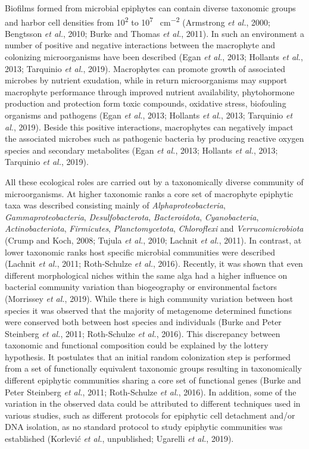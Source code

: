 \documentclass[12pt,]{article}
\begin{document}
Biofilms formed from microbial epiphytes can contain diverse taxonomic
groups and harbor cell densities from 10\textsuperscript{2} to
10\textsuperscript{7} \si{\cells\per\cm\squared} (Armstrong \emph{et
al.}, 2000; Bengtsson \emph{et al.}, 2010; Burke and Thomas \emph{et
al.}, 2011). In such an environment a number of positive and negative
interactions between the macrophyte and colonizing microorganisms have
been described (Egan \emph{et al.}, 2013; Hollants \emph{et al.}, 2013;
Tarquinio \emph{et al.}, 2019). Macrophytes can promote growth of
associated microbes by nutrient exudation, while in return
microorganisms may support macrophyte performance through improved
nutrient availability, phytohormone production and protection form toxic
compounds, oxidative stress, biofouling organisms and pathogens (Egan
\emph{et al.}, 2013; Hollants \emph{et al.}, 2013; Tarquinio \emph{et
al.}, 2019). Beside this positive interactions, macrophytes can
negatively impact the associated microbes such as pathogenic bacteria by
producing reactive oxygen species and secondary metabolites (Egan
\emph{et al.}, 2013; Hollants \emph{et al.}, 2013; Tarquinio \emph{et
al.}, 2019).

All these ecological roles are carried out by a taxonomically diverse
community of microorganisms. At higher taxonomic ranks a core set of
macrophyte epiphytic taxa was described consisting mainly of
\emph{Alphaproteobacteria}, \emph{Gammaproteobacteria},
\emph{Desulfobacterota}, \emph{Bacteroidota}, \emph{Cyanobacteria},
\emph{Actinobacteriota}, \emph{Firmicutes}, \emph{Planctomycetota},
\emph{Chloroflexi} and \emph{Verrucomicrobiota} (Crump and Koch, 2008;
Tujula \emph{et al.}, 2010; Lachnit \emph{et al.}, 2011). In contrast,
at lower taxonomic ranks host specific microbial communities were
described (Lachnit \emph{et al.}, 2011; Roth-Schulze \emph{et al.},
2016). Recently, it was shown that even different morphological niches
within the same alga had a higher influence on bacterial community
variation than biogeography or environmental factors (Morrissey \emph{et
al.}, 2019). While there is high community variation between host
species it was observed that the majority of metagenome determined
functions were conserved both between host species and individuals
(Burke and Peter Steinberg \emph{et al.}, 2011; Roth-Schulze \emph{et
al.}, 2016). This discrepancy between taxonomic and functional
composition could be explained by the lottery hypothesis. It postulates
that an initial random colonization step is performed from a set of
functionally equivalent taxonomic groups resulting in taxonomically
different epiphytic communities sharing a core set of functional genes
(Burke and Peter Steinberg \emph{et al.}, 2011; Roth-Schulze \emph{et
al.}, 2016). In addition, some of the variation in the observed data
could be attributed to different techniques used in various studies,
such as different protocols for epiphytic cell detachment and/or DNA
isolation, as no standard protocol to study epiphytic communities was
established (Korlević \emph{et al.}, unpublished; Ugarelli \emph{et
al.}, 2019).
\end{document}
